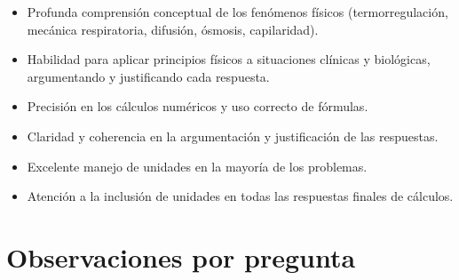 \documentclass[11pt,a4paper]{article}
\begin{document}
\vspace{4pt}
\begin{minipage}[t]{0.48\linewidth}
  \begin{tcolorbox}[cajaFortaleza, title={Fortalezas}]
\begin{itemize}[leftmargin=1.5em, itemsep=2pt]
  \item Profunda comprensión conceptual de los fenómenos físicos (termorregulación, mecánica respiratoria, difusión, ósmosis, capilaridad).
  \item Habilidad para aplicar principios físicos a situaciones clínicas y biológicas, argumentando y justificando cada respuesta.
  \item Precisión en los cálculos numéricos y uso correcto de fórmulas.
  \item Claridad y coherencia en la argumentación y justificación de las respuestas.
  \item Excelente manejo de unidades en la mayoría de los problemas.
\end{itemize}
  \end{tcolorbox}
\end{minipage}
\hfill
\begin{minipage}[t]{0.48\linewidth}
  \begin{tcolorbox}[cajaMejora, title={Areas de mejora}]
\begin{itemize}[leftmargin=1.5em, itemsep=2pt]
  \item Atención a la inclusión de unidades en todas las respuestas finales de cálculos.
\end{itemize}
  \end{tcolorbox}
\end{minipage}

\section*{Observaciones por pregunta}
\end{document}
